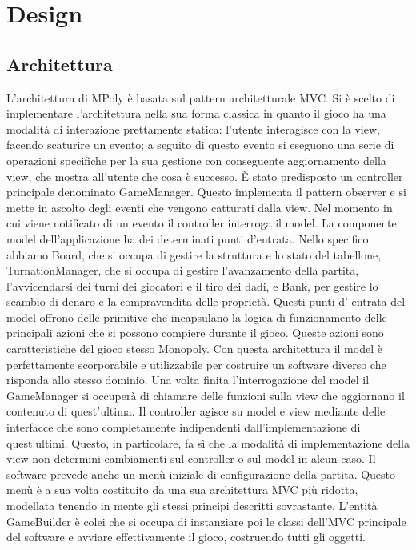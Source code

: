 \chapter{Design}

\section{Architettura}
L’architettura di MPoly è basata sul pattern architetturale MVC.
Si è scelto di implementare l’architettura nella sua forma classica in quanto il gioco 
ha una modalità di interazione prettamente statica: l’utente interagisce con la view, 
facendo scaturire un evento; a seguito di questo evento si eseguono una serie di operazioni 
specifiche per la sua gestione con conseguente aggiornamento della view, che mostra all’utente che cosa è successo.   
È stato predisposto un controller principale denominato GameManager. 
Questo implementa il pattern observer e si mette in ascolto degli eventi che vengono catturati dalla view. 
Nel momento in cui viene notificato di un evento il controller interroga il model.
La componente model dell'applicazione ha dei determinati punti d'entrata. 
Nello specifico abbiamo Board, che si occupa di gestire la struttura e lo stato del tabellone,
TurnationManager, che si occupa di gestire l’avanzamento della partita, l'avvicendarsi dei turni dei giocatori e il tiro dei dadi, 
e Bank, per gestire lo scambio di denaro e la compravendita delle proprietà. 
Questi punti d’ entrata del model offrono delle primitive che incapsulano la logica di funzionamento 
delle principali azioni che si possono compiere durante il gioco. Queste azioni sono caratteristiche del 
gioco stesso Monopoly. 
Con questa architettura il model è perfettamente scorporabile e utilizzabile per costruire 
un software diverso che risponda allo stesso dominio. 
Una volta finita l’interrogazione del model il GameManager si occuperà di chiamare 
delle funzioni sulla view che aggiornano il contenuto di quest’ultima. 
Il controller agisce su model e view mediante delle interfacce che sono completamente indipendenti 
dall’implementazione di quest’ultimi. 
Questo, in particolare, fa sì che la modalità di implementazione della view non determini cambiamenti sul 
controller o sul model in alcun caso. 
Il software prevede anche un menù iniziale di configurazione della partita. 
Questo menù è a sua volta costituito da una sua architettura MVC più ridotta, 
modellata tenendo in mente gli stessi principi descritti sovrastante. 
L’entità GameBuilder è colei che si occupa di instanziare poi le classi dell’MVC principale del software e avviare effettivamente il gioco,
costruendo tutti gli oggetti.

